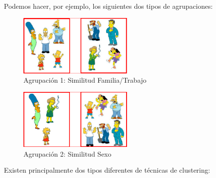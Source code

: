 \documentclass[a4paper, 11pt]{article} %
\begin{document}
Podemos hacer, por ejemplo, los siguientes dos tipos de agrupaciones:

\begin{figure}[H]
\centering
\includegraphics[width=0.5\textwidth]{Agrupacion1.PNG}
\caption{Agrupación 1: Similitud Familia/Trabajo}
\label{Similitud Familia/Trabajo}
\end{figure}

\begin{figure}[H]
\centering
\includegraphics[width=0.5\textwidth]{Agrupacion2.PNG}
\caption{Agrupación 2: Similitud Sexo}
\label{Similitud Sexo}
\end{figure}

Existen principalmente dos tipos diferentes de técnicas de clustering:
\end{document}
